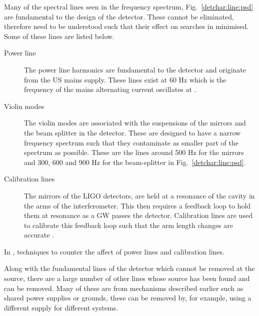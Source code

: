 Many of the spectral lines seen in the frequency spectrum, Fig.~\ref{detchar:line:psd} are fundamental to the design of the detector. 
These cannot be eliminated, therefore need to be understood such that their effect on searches in minimised.
Some of these lines are listed below.
\begin{description}
	\item[Power line] The power line harmonics are fundamental to the detector and originate from the US mains supply. These lines exist at 60 Hz which is the frequency of the mains alternating current oscillates at \citep{aasi2015CharacterizationLIGO}.
	
	\item[Violin modes] The violin modes are associated with the suspensions of the mirrors and the beam splitter in the detector. These are designed to have a narrow frequency spectrum such that they contaminate as smaller part of the spectrum as possible. These are the lines around 500 Hz for the mirrors and 300, 600 and 900 Hz for the beam-splitter \citep{GWOpen} in Fig.~\ref{detchar:line:psd}.
	
	\item[Calibration lines] The mirrors of the \ac{LIGO} detectors, are held at a resonance of the cavity in the arms of the interferometer. This then requires a feedback loop to hold them at resonance as a \ac{GW} passes the detector. Calibration lines are used to calibrate this feedback loop such that the arm length changes are accurate \citep{tuyenbayev2016ImprovingLIGO,coughlin2010NoiseLine}.
\end{description}
In \citep{davis2019ImprovingSensitivity}, techniques to counter the affect of power lines and calibration lines. 

Along with the fundamental lines of the detector which cannot be removed at the source, there are a large number of other lines whose source has been found and can be removed. 
Many of these are from mechanisms described earlier such as shared power supplies or grounds, these can be removed by, for example, using a different supply for different systems.

